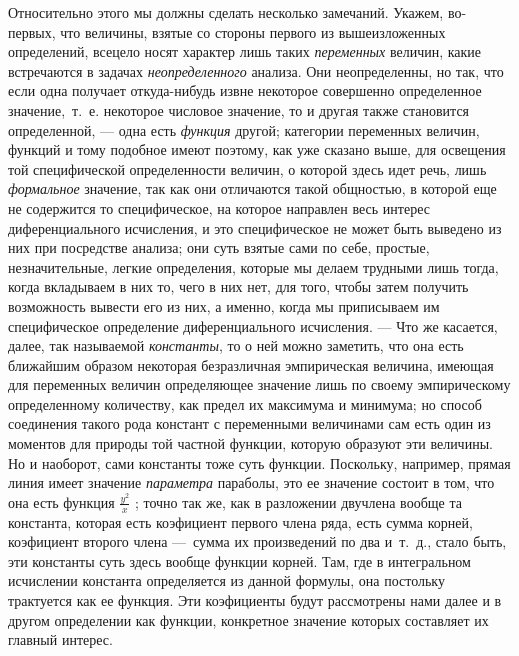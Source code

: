 {Относительно этого мы должны сделать несколько замечаний. Укажем, во-первых,
что величины, взятые со стороны первого из вышеизложенных определений,
всецело носят характер лишь таких {\em переменных}
величин, какие встречаются в задачах
{\em неопределенного} анализа. Они неопределенны, но
так, что если одна получает откуда-нибудь извне некоторое совершенно
определенное значение,~т.~е. некоторое числовое значение, то и другая также
становится определенной, — одна есть {\em функция}
другой; категории переменных величин, функций и тому подобное имеют
поэтому, как уже сказано выше, для освещения той специфической
определенности величин, о которой здесь идет речь, лишь
{\em формальное} значение, так как они отличаются такой
общностью, в которой еще не содержится то специфическое, на которое
направлен весь интерес диференциального исчисления, и это специфическое не
может быть выведено из них при посредстве анализа; они суть взятые сами по
себе, простые, незначительные, легкие определения, которые мы делаем
трудными лишь тогда, когда вкладываем в них то, чего в них нет, для того,
чтобы затем получить возможность вывести его из них, а именно, когда мы
приписываем им специфическое определение диференциального исчисления. — Что
же касается, далее, так называемой {\em константы}, то
о ней можно заметить, что она есть ближайшим образом некоторая безразличная
эмпирическая величина, имеющая для переменных величин определяющее значение
лишь по своему эмпирическому определенному количеству, как предел их
максимума и минимума; но способ соединения такого рода констант с
переменными величинами сам есть один из моментов для природы той частной
функции, которую образуют эти величины. Но и наоборот, сами константы тоже
суть функции. Поскольку, например, прямая линия имеет значение
{\em параметра} параболы, это ее значение состоит в
том, что она есть функция  $\frac{y^2} x$  ; точно так же, как в разложении
двучлена вообще та константа, которая есть коэфициент первого члена ряда,
есть сумма корней, коэфициент второго члена —~сумма их произведений по два
и~т.~д., стало быть, эти константы суть здесь вообще функции корней. Там,
где в интегральном исчислении константа определяется из данной формулы, она
постольку трактуется как ее функция. Эти коэфициенты будут рассмотрены нами
далее и в другом определении как функции, конкретное значение которых
составляет их главный интерес.

}

